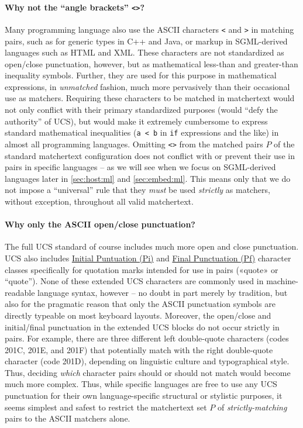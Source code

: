 \paragraph{Why not the ``angle brackets'' \texttt{<>}?}
Many programming language also use the ASCII characters \verb|<| and \verb|>|
in matching pairs,
such as for generic types in C++ and Java,
or markup in SGML-derived languages such as HTML and XML.
These characters are not standardized as open/close punctuation, however,
but as mathematical less-than and greater-than inequality symbols.
Further, they are used for this purpose in mathematical expressions,
in \emph{unmatched} fashion,
much more pervasively than their occasional use as matchers.
Requiring these characters to be matched in matchertext
would not only conflict with their primary standardized purposes
(\ie would ``defy the authority'' of UCS),
but would make it extremely cumbersome to express
standard mathematical inequalities
(\eg \verb|a < b| in \verb|if| expressions and the like)
in almost all programming languages.
Omitting \verb|<>| from the matched pairs $P$
of the standard matchertext configuration does not
conflict with or prevent their use in pairs in specific languages --
as we will see when we focus on SGML-derived languages later
in \cref{sec:host:ml} and \cref{sec:embed:ml}.
This means only that we do not impose a ``universal'' rule
that they \emph{must} be used \emph{strictly} as matchers,
without exception, throughout all valid matchertext.

\paragraph{Why only the ASCII open/close punctuation?}
The full UCS standard of course includes
much more open and close punctuation.
UCS also includes
\href{https://www.compart.com/en/unicode/category/Pi}{Initial Puntuation (Pi)}
and 
\href{https://www.compart.com/en/unicode/category/Pf}{Final Punctuation (Pf)}
character classes specifically for quotation marks
intended for use in pairs
(\eg «quote» or “quote”).
None of these extended UCS characters are commonly used
in machine-readable language syntax, however --
no doubt in part merely by tradition,
but also for the pragmatic reason that only the ASCII punctuation symbols
are directly typeable on most keyboard layouts.
Moreover, the open/close and initial/final punctuation
in the extended UCS blocks
do not occur strictly in pairs.
For example,
there are three different left double-quote characters
(codes 201C, 201E, and 201F)
that potentially match with the right double-quote character (code 201D),
depending on linguistic culture and typographical style.
Thus, deciding \emph{which} character pairs should or should not match
would become much more complex.
Thus, while specific languages are free to use any UCS punctuation
for their own language-specific structural or stylistic purposes,
it seems simplest and safest to restrict the matchertext set $P$ of
\emph{strictly-matching} pairs to the ASCII matchers alone.

